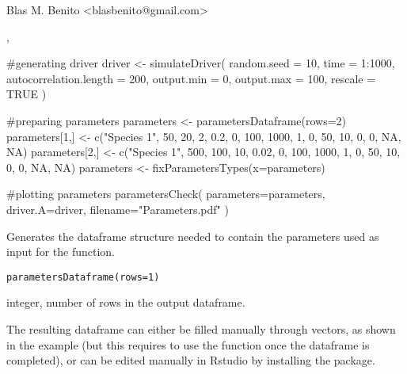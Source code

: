 \documentclass[letterpaper]{book}
\begin{document}
%
\begin{Author}\relax
Blas M. Benito  <blasbenito@gmail.com>
\end{Author}
%
\begin{SeeAlso}\relax
{}, 
\end{SeeAlso}
%
\begin{Examples}
\begin{ExampleCode}
#generating driver
driver <- simulateDriver(
 random.seed = 10,
 time = 1:1000,
 autocorrelation.length = 200,
 output.min = 0,
 output.max = 100,
 rescale = TRUE
 )

#preparing parameters
parameters <- parametersDataframe(rows=2)
parameters[1,] <- c("Species 1", 50, 20, 2, 0.2, 0, 100, 1000, 1, 0, 50, 10, 0, 0, NA, NA)
parameters[2,] <- c("Species 1", 500, 100, 10, 0.02, 0, 100, 1000, 1, 0, 50, 10, 0, 0, NA, NA)
parameters <- fixParametersTypes(x=parameters)

#plotting parameters
parametersCheck(
 parameters=parameters,
 driver.A=driver,
 filename="Parameters.pdf"
 )

\end{ExampleCode}
\end{Examples}
%
\begin{Description}\relax
Generates the dataframe structure needed to contain the parameters used as input for the  function.
\end{Description}
%
\begin{Usage}
\begin{verbatim}
parametersDataframe(rows=1)
\end{verbatim}
\end{Usage}
%
\begin{Arguments}
\begin{ldescription}
\item[\code{rows}] integer, number of rows in the output dataframe.
\end{ldescription}
\end{Arguments}
%
\begin{Details}\relax
The resulting dataframe can either be filled manually through vectors, as shown in the example (but this requires to use the function  once the dataframe is completed), or can be edited manually in Rstudio by installing the  package.
\end{Details}
\end{document}
